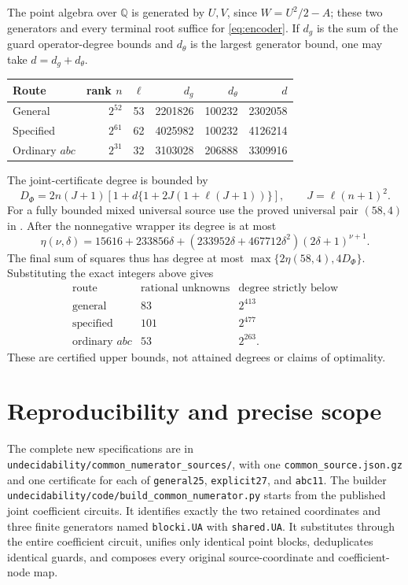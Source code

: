 \documentclass[11pt]{article}
\newcommand{\Q}{\mathbb Q}
\begin{document}
The point algebra over \(\Q\) is generated by \(U,V\), since
\(W=U^2/2-A\); these two generators and every terminal root
suffice for \eqref{eq:encoder}. If \(d_g\) is the sum of the
guard operator-degree bounds and \(d_\theta\) is the largest
generator bound, one may take \(d=d_g+d_\theta\).
\begin{center}
\begin{tabular}{lrrrrr}
\toprule
Route&rank \(n\)&\(\ell\)&\(d_g\)&\(d_\theta\)&\(d\)\\
\midrule
General&\(2^{52}\)&53&2201826&100232&2302058\\
Specified&\(2^{61}\)&62&4025982&100232&4126214\\
Ordinary \(abc\)&\(2^{31}\)&32&3103028&206888&3309916\\
\bottomrule
\end{tabular}
\end{center}
The joint-certificate degree is bounded by
\begin{equation}\label{eq:degree}
 D_{\Phi}=2n(J+1)\left[1+d\{1+2J(1+\ell(J+1))\}\right],
             \qquad J=\ell(n+1)^2 .
\end{equation}
For a fully bounded mixed universal source use the proved
universal pair \((58,4)\) in
\cite[Theorem 3, Definition 5.3 and Section 6.1]{BDHMS}.
After the nonnegative wrapper its degree is at most
\[
 \eta(\nu,\delta)=15616+233856\delta+
       (233952\delta+467712\delta^2)(2\delta+1)^{\nu+1}.
\]
The final sum of squares thus has degree at most
\(\max\{2\eta(58,4),4D_\Phi\}\). Substituting the exact
integers above gives
\[
\begin{array}{c|c|c}
 \text{route}&\text{rational unknowns}&\text{degree strictly below}\\ \hline
 \text{general}&83&2^{413}\\
 \text{specified}&101&2^{477}\\
 \text{ordinary }abc&53&2^{263}.
\end{array}
\]
These are certified upper bounds, not attained degrees or
claims of optimality.

\section{Reproducibility and precise scope}

The complete new specifications are in
\nolinkurl{undecidability/common_numerator_sources/}, with
one \texttt{common\_source.json.gz} and one certificate for
each of \texttt{general25}, \texttt{explicit27}, and
\texttt{abc11}. The builder
\nolinkurl{undecidability/code/build_common_numerator.py}
starts from the published joint coefficient circuits.
It identifies exactly the two retained coordinates and
three finite generators named \texttt{blocki.UA} with
\texttt{shared.UA}. It substitutes through the entire
coefficient circuit, unifies only identical point blocks,
deduplicates identical guards, and composes every original
source-coordinate and coefficient-node map.
\end{document}
